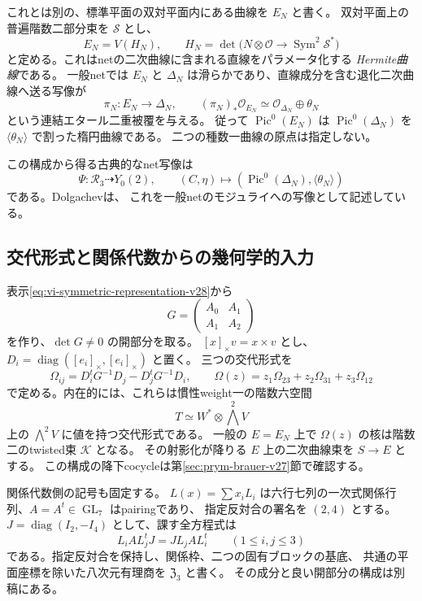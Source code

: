 これとは別の、標準平面の双対平面内にある曲線を $E_N$ と書く。
双対平面上の普遍階数二部分束を $\mathcal S$ とし、
\[
 E_N=V(H_N),\qquad
 H_N=\det\bigl(N\otimes\mathcal O\longrightarrow
                       \operatorname{Sym}^2\mathcal S^*\bigr)
\]
と定める。これはnetの二次曲線に含まれる直線をパラメータ化する
\emph{Hermite曲線}である\cite[\S3.2.2, Exercise 3.12]{DolgachevCAG}。
一般netでは $E_N$ と $\Delta_N$ は滑らかであり、直線成分を含む退化二次曲線へ送る写像が
\[
 \pi_N:E_N\longrightarrow\Delta_N,
 \qquad (\pi_N)_*\mathcal O_{E_N}\simeq
                  \mathcal O_{\Delta_N}\oplus\theta_N
\]
という連結エタール二重被覆を与える。
従って $\operatorname{Pic}^0(E_N)$ は
$\operatorname{Pic}^0(\Delta_N)$ を $\langle\theta_N\rangle$ で割った楕円曲線である。
二つの種数一曲線の原点は指定しない。

この構成から得る古典的なnet写像は
\[
 \Psi:\mathcal R_3\dashrightarrow Y_0(2),
 \qquad (C,\eta)\longmapsto
 (\operatorname{Pic}^0(\Delta_N),\langle\theta_N\rangle)
\]
である。Dolgachev\cite[Remark 4.1]{DolgachevRationality2008}は、
これを一般netのモジュライへの写像として記述している。

\subsection{交代形式と関係代数からの幾何学的入力}

表示\eqref{eq:vi-symmetric-representation-v28}から
\[
 G=\begin{pmatrix}A_0&A_1\\A_1&A_2\end{pmatrix}
\]
を作り、$\det G\ne0$ の開部分を取る。
$[x]_\times v=x\times v$ とし、
$D_i=\operatorname{diag}([e_i]_\times,[e_i]_\times)$ と置く。
三つの交代形式を
\begin{equation}\label{eq:vi-omega-v28}
 \Omega_{ij}=D_i^tG^{-1}D_j-D_j^tG^{-1}D_i,\qquad
 \Omega(z)=z_1\Omega_{23}+z_2\Omega_{31}+z_3\Omega_{12}
\end{equation}
で定める。内在的には、これらは慣性weight一の階数六空間
\[
 T\simeq W^*\otimes\bigwedge^2V
\]
上の $\bigwedge^2V$ に値を持つ交代形式である。
一般の $E=E_N$ 上で $\Omega(z)$ の核は階数二のtwisted束 $\mathcal K$ となる。
その射影化が降りる $E$ 上の二次曲線束を $S\to E$ とする。
この構成の降下cocycleは第\ref{sec:prym-brauer-v27}節で確認する。

関係代数側の記号も固定する。
$L(x)=\sum x_iL_i$ は六行七列の一次式関係行列、$A=A^t\in\operatorname{GL}_7$ はpairingであり、
指定反対合の署名を $(2,4)$ とする。
$J=\operatorname{diag}(I_2,-I_4)$ として、課す全方程式は
\[
 L_iAL_j^tJ=JL_jAL_i^t\qquad(1\le i,j\le3)
\]
である。指定反対合を保持し、関係枠、二つの固有ブロックの基底、
共通の平面座標を除いた八次元有理商を $\mathfrak Z_3$ と書く。
その成分と良い開部分の構成は別稿\cite{PaperV}にある。

